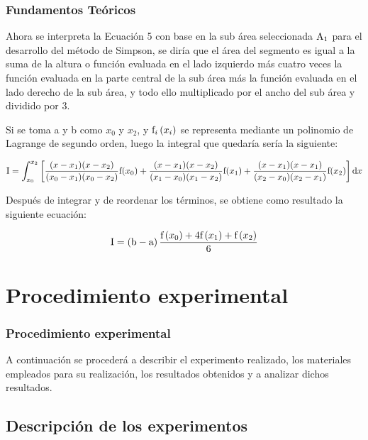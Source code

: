 \documentclass{beamer}
\begin{document}
\begin{frame}
\frametitle{Fundamentos Teóricos}
	Ahora se interpreta la Ecuación 5 con base en la sub área seleccionada $\textup{A}_{1}$ para el desarrollo del método de Simpson, se diría que el área del segmento es igual a la suma de la altura o función evaluada en el lado izquierdo más cuatro veces la función evaluada en la parte central de la sub área más la función evaluada en el lado derecho de la sub área, y todo ello multiplicado por el ancho del sub área y dividido por 3.
	
	Si se toma a y b como $ x_{0} $ y $ x_{2} $, y $ \textup{f}_{i}\left(x_{i}\right) $ se representa mediante un polinomio de Lagrange de segundo orden, luego la integral que quedaría sería la siguiente:
	
	\[ \textup{I} = \int_{x_{0}}^{x_{2}}\left[\frac{(x - x_{1})(x - x_{2})}{(x_{0} - x_{1})(x_{0} - x_{2})}\textup{f}(x_{0}) + \frac{(x 
	- x_{1})(x - x_{2})}{(x_{1} - x_{0})(x_{1} - x_{2})}\textup{f}(x_{1}) + \frac{(x - x_{1})(x - x_{1})}{(x_{2} - x_{0})(x_{2} - 
	x_{1})}\textup{f}(x_{2})\right]\textup{d}x\]	
	
	Después de integrar y de reordenar los términos, se obtiene como resultado la siguiente ecuación:
	
	\[\textup{I} = \left(\textup{b}-\textup{a}\right)\frac{\textup{f}\left(x_{0}\right) + 4\textup{f}\left(x_{1}\right) + \textup{f}\left(x_{2}\right)}{6}\]

\end{frame}


\section{Procedimiento experimental}

\begin{frame}
\frametitle{Procedimiento experimental}

	A continuación se procederá a describir el experimento realizado, los materiales empleados para su realización,
los resultados obtenidos y a analizar dichos resultados.

\end{frame}

\subsection{Descripción de los experimentos}
\end{document}
